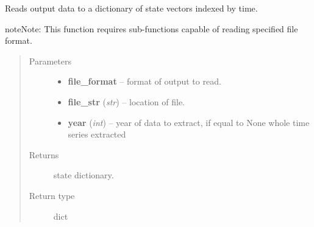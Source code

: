 \documentclass[letterpaper,10pt,english]{sphinxmanual}
\begin{document}

\begin{fulllineitems}
\label{source/sentinel_simulator:sentinel_simulator.stateVector.nearest}
\end{fulllineitems}


\begin{fulllineitems}
\label{source/sentinel_simulator:sentinel_simulator.stateVector.read}
Reads output data to a dictionary of state vectors indexed by time.

\begin{notice}{note}{Note:}
This function requires sub-functions capable of reading specified file format.
\end{notice}
\begin{quote}\begin{description}
\item[{Parameters}] \leavevmode\begin{itemize}
\item {} 
\textbf{file\_format} -- format of output to read.

\item {} 
\textbf{file\_str} (\emph{str}) -- location of file.

\item {} 
\textbf{year} (\emph{int}) -- year of data to extract, if equal to None whole time series extracted

\end{itemize}

\item[{Returns}] \leavevmode
state dictionary.

\item[{Return type}] \leavevmode
dict

\end{description}\end{quote}

\end{fulllineitems}

\end{document}

